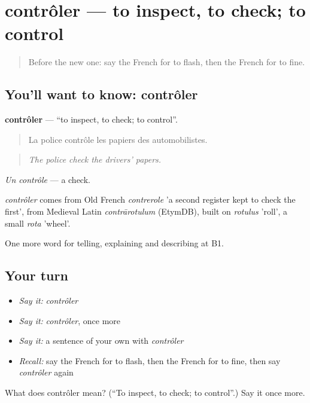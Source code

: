 \section[contrôler]{contrôler — to inspect, to check; to control}

\label{lesson:FR-C408-controler}



\begin{quote}
Before the new one: say the French for to flash, then the French for to fine.
\end{quote}

\subsection*{You'll want to know: contrôler}
\textbf{contrôler} — \textquotedblleft{}to inspect, to check; to control\textquotedblright{}.

\begin{quote}
La police contrôle les papiers des automobilistes.
\end{quote}

\begin{quote}
\emph{The police check the drivers' papers.}
\end{quote}

\emph{Un contrôle} — a check.

\begin{cousinweb}
\emph{contrôler} comes from Old French \emph{contrerole} 'a second register kept to check the first', from Medieval Latin \emph{contrārotulum} (EtymDB), built on \emph{rotulus} 'roll', a small \emph{rota} 'wheel'.
\end{cousinweb}

\begin{grammarlens}[title={What you've built}]
One more word for telling, explaining and describing at B1.
\end{grammarlens}

\subsection*{Your turn}
\begin{itemize}
\raggedright
  \item \emph{Say it:} \emph{contrôler}
  \item \emph{Say it:} \emph{contrôler}, once more
  \item \emph{Say it:} a sentence of your own with \emph{contrôler}
  \item \emph{Recall:} say the French for to flash, then the French for to fine, then say \emph{contrôler} again
\end{itemize}

\begin{tcolorbox}[breakable,colback=teal!4,colframe=teal!35!black,title={Before you move on}]
What does contrôler mean? (\textquotedblleft{}To inspect, to check; to control\textquotedblright{}.) Say it once more.
\end{tcolorbox}
